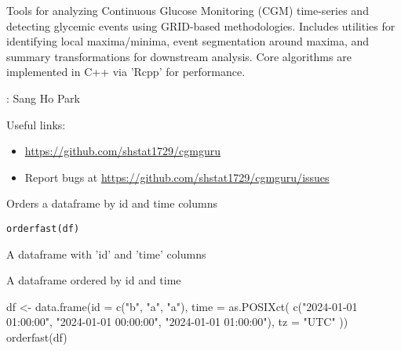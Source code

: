 \documentclass[a4paper]{book}
\begin{document}
%
\begin{Description}
Tools for analyzing Continuous Glucose Monitoring (CGM) time-series and detecting glycemic events using GRID-based methodologies. Includes utilities for identifying local maxima/minima, event segmentation around maxima, and summary transformations for downstream analysis. Core algorithms are implemented in C++ via 'Rcpp' for performance.
\end{Description}
%
\begin{Author}
: Sang Ho Park 

\end{Author}
%
\begin{SeeAlso}
Useful links:
\begin{itemize}

\item{} \url{https://github.com/shstat1729/cgmguru}
\item{} Report bugs at \url{https://github.com/shstat1729/cgmguru/issues}

\end{itemize}


\end{SeeAlso}
%
\begin{Description}
Orders a dataframe by id and time columns
\end{Description}
%
\begin{Usage}
\begin{verbatim}
orderfast(df)
\end{verbatim}
\end{Usage}
%
\begin{Arguments}
\begin{ldescription}
\item[\code{df}] A dataframe with 'id' and 'time' columns
\end{ldescription}
\end{Arguments}
%
\begin{Value}
A dataframe ordered by id and time
\end{Value}
%
\begin{Examples}
\begin{ExampleCode}
df <- data.frame(id = c("b", "a", "a"), time = as.POSIXct(
  c("2024-01-01 01:00:00", "2024-01-01 00:00:00", "2024-01-01 01:00:00"), tz = "UTC"
))
orderfast(df)
\end{ExampleCode}
\end{Examples}
\printindex{}
\end{document}
